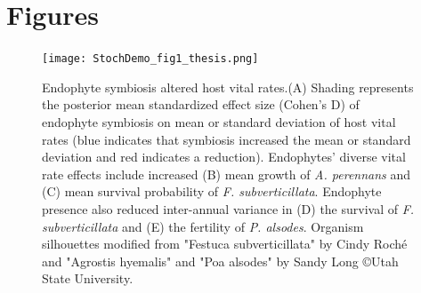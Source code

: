 \documentclass[9pt,twocolumn,twoside]{pnas-new}
\begin{document}

\showacknow{} %


\bibsplit[24]



\clearpage



\section*{Figures}

\begin{figure}
	\centering
	\texttt{[image: StochDemo\_fig1\_thesis.png]}
	\caption{Endophyte symbiosis altered host vital rates.(A) Shading represents the posterior mean standardized effect size (Cohen's D) of endophyte symbiosis on mean or standard deviation of host vital rates (blue indicates that symbiosis increased the mean or standard deviation and red indicates a reduction). Endophytes' diverse vital rate effects include increased (B) mean growth of \emph{A. perennans} and (C) mean survival probability of \emph{F. subverticillata}. Endophyte presence also reduced inter-annual variance in (D) the survival of \emph{F. subverticillata} and (E) the fertility of \emph{P. alsodes}. Organism silhouettes modified from "Festuca subverticillata" by Cindy Roch\'e and "Agrostis hyemalis" and "Poa alsodes" by Sandy Long \copyright Utah State University.}
\end{figure}
\end{document}
